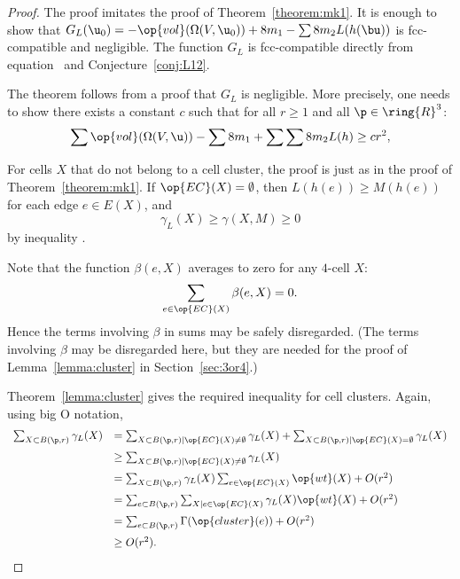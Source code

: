 \begin{proof} The proof imitates the proof of
Theorem~\ref{theorem:mk1}.  It is enough to show that $G_L( \u_0) =
-\op{vol}(\Omega(V, \u_0)) + 8 m_1 - \sum 8 m_2 L(h(\bu))$ is
fcc-compatible and negligible.  The function $G_L$ is fcc-compatible
directly from equation~ and Conjecture~\ref{conj:L12}.

The theorem follows from a proof that $G_L$ is negligible.  More
precisely, one needs to show there exists a constant $c$ such that
for all $r\ge 1$ and all $\p\in\ring{R}^3$:
\begin{equation}\label{eqn:A2neg}
\sum \op{vol}(\Omega(V, \u)) -\sum 8m_1 + \sum \sum 8 m_2 L(h) \ge c r^2,
\end{equation}

For cells $X$ that do not belong to a cell cluster,
the proof is just as in the proof of Theorem~\ref{theorem:mk1}.
If $\op{EC}(X)=\emptyset$, then 
$L(h(e))\ge M(h(e))$ for each edge $e\in E(X)$, and
\begin{displaymath}\gamma_L(X)\ge \gamma(X,M)\ge 0\end{displaymath} 
by inequality .

Note that the function $\beta(e,X)$ averages to zero for any $4$-cell $X$:
\begin{displaymath}
\sum_{e\in \op{EC}(X)} \beta(e,X) = 0.
\end{displaymath}
Hence the terms involving $\beta$ in sums may be safely disregarded.
(The terms involving $\beta$ may be disregarded here, but they are
needed for the proof of Lemma~\ref{lemma:cluster} in
Section~\ref{sec:3or4}.)

Theorem~\ref{lemma:cluster} gives the required inequality for cell
clusters.  Again, using big O notation,
\begin{displaymath}
\begin{array}{lll}
\sum_{X\subset B(\p,r)} \gamma_L(X) &= 
\sum_{X\subset B(\p,r)\mid \op{EC}(X)\ne\emptyset} \gamma_L(X) +
\sum_{X\subset B(\p,r)\mid \op{EC}(X)=\emptyset} \gamma_L(X) \vspace{6pt}\\
&\ge \sum_{X\subset B(\p,r)\mid \op{EC}(X)\ne\emptyset} \gamma_L(X)\vspace{6pt} \\
&=\sum_{X\subset B(\p,r)}\gamma_L(X)\sum_{e \in \op{EC}(X)}\op{wt}(X) + O(r^2)\vspace{6pt}\\
&=\sum_{e\subset B(\p,r)}\sum_{X\mid e \in \op{EC}(X)}\gamma_L(X)\op{wt}(X) + O(r^2)\vspace{6pt}\\
&=\sum_{e\subset B(\p,r)}\Gamma(\op{cluster}(e)) + O(r^2)\vspace{6pt}\\
&\ge O(r^2).
\end{array}
\end{displaymath}


\end{proof}
